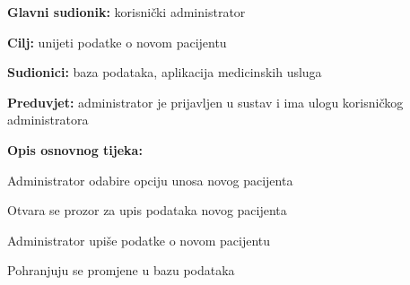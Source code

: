                         \noindent {}
					\begin{packed_item}
	
						\item \textbf{Glavni sudionik: }korisnički administrator
						\item  \textbf{Cilj:} unijeti podatke o novom pacijentu
						\item  \textbf{Sudionici:} baza podataka, aplikacija medicinskih usluga
						\item  \textbf{Preduvjet:} administrator je prijavljen u sustav i ima ulogu korisničkog administratora
						\item  \textbf{Opis osnovnog tijeka:}
						
						\item[] \begin{packed_enum}
	
							\item Administrator odabire opciju unosa novog pacijenta
                                \item Otvara se prozor za upis podataka novog pacijenta
                                \item Administrator upiše podatke o novom pacijentu
                                \item Pohranjuju se promjene u bazu podataka
						\end{packed_enum}
						
					\end{packed_item}

